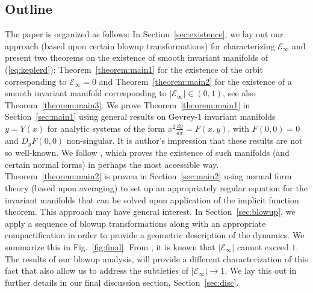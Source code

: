 \documentclass[reqno,12pt]{amsart}
\newcommand{\secref}[1]{Section~\ref{sec:#1}}
\renewcommand{\eqref}[1]{(\ref{eq:#1})}
\newcommand{\figref}[1]{Fig.~\ref{fig:#1}}
\newcommand{\thmref}[1]{Theorem~\ref{theorem:#1}}
\numberwithin{equation}{section}
\begin{document}
% 

% 
% 
% 
% 


\subsection{Outline}
The paper is organized as follows: In \secref{existence}, we lay out our approach (based upon certain blowup transformations) for characterizing $\mathcal E_\infty$ and present two theorems on the existence of smooth invariant manifolds of \eqref{keplerd}: \thmref{main1} for the existence of the orbit corresponding to $\mathcal E_\infty=0$ and \thmref{main2} for the existence of a smooth invariant manifold corresponding to $\vert \mathcal E_\infty\vert \in (0,1)$, see also \thmref{main3}. We prove \thmref{main1} in \secref{main1} using general results on Gevrey-1 invariant manifolds $y=Y(x)$ for analytic systems of the form $x^2 \frac{dy}{dx} = F(x,y)$, with $F(0,0)=0$ and $D_y F(0,0)$ non-singular. It is author's impression that these results are not so well-known. We follow \cite{bonckaert2008a}, which proves the existence of such manifolds (and certain normal forms) in perhaps the most accessible way.  \thmref{main2} is proven in \secref{main2} using normal form theory (based upon averaging) to set up an appropriately regular equation for the invariant manifolds that can be solved upon application of the implicit function theorem. This approach may have general interest. In \secref{blowup}, we apply a sequence of blowup transformations along with an appropriate compactification in order to provide a geometric description of the dynamics. We summarize this in \figref{final}. From \cite{margheri2017a}, it is known that $\vert \mathcal E_\infty\vert$ cannot exceed $1$. The results of our blowup analysis, will provide a different characterization of this fact that also allow us to address the subtleties of $\vert \mathcal E_\infty\vert\rightarrow 1$. We lay this out in further details in our final discussion section, \secref{disc}.
\end{document}
